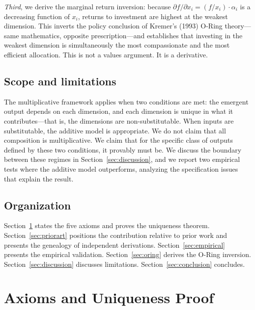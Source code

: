 \documentclass[12pt, a4paper]{article}
\theoremstyle{definition}
\theoremstyle{remark}
\begin{document}
\textit{Third}, we derive the marginal return inversion: because $\partial f / \partial x_i = (f / x_i) \cdot \alpha_i$ is a decreasing function of $x_i$, returns to investment are highest at the weakest dimension. This inverts the policy conclusion of Kremer's (1993) O-Ring theory---same mathematics, opposite prescription---and establishes that investing in the weakest dimension is simultaneously the most compassionate and the most efficient allocation. This is not a values argument. It is a derivative.

\subsection{Scope and limitations}

The multiplicative framework applies when two conditions are met: the emergent output depends on each dimension, and each dimension is unique in what it contributes---that is, the dimensions are non-substitutable. When inputs are substitutable, the additive model is appropriate. We do not claim that all composition is multiplicative. We claim that for the specific class of outputs defined by these two conditions, it provably must be. We discuss the boundary between these regimes in Section~\ref{sec:discussion}, and we report two empirical tests where the additive model outperforms, analyzing the specification issues that explain the result.

\subsection{Organization}

Section~\ref{sec:axioms} states the five axioms and proves the uniqueness theorem. Section~\ref{sec:priorart} positions the contribution relative to prior work and presents the genealogy of independent derivations. Section~\ref{sec:empirical} presents the empirical validation. Section~\ref{sec:oring} derives the O-Ring inversion. Section~\ref{sec:discussion} discusses limitations. Section~\ref{sec:conclusion} concludes.


\section{Axioms and Uniqueness Proof}\label{sec:axioms}
\end{document}
